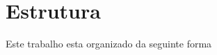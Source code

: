 \section{Estrutura}
\label{sec:Introducao_structure}

Este trabalho esta organizado da seguinte forma
